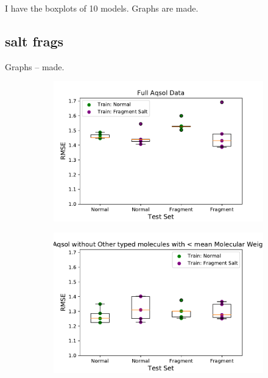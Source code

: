 \documentclass[journal=jmcmar,manuscript=article]{achemso}
\begin{document}
I have the boxplots of 10 models. Graphs are made.

\subsection{salt frags}
Graphs -- made.

\begin{figure}[tb]
    \centering
    \begin{subfigure}[t]{0.48\textwidth}
        \centering
        \includegraphics[width=\linewidth]{figures/full_saltfragfirst_RMSEs_boxplots.pdf}
    \end{subfigure}%
    \hfill
    \begin{subfigure}[t]{0.48\textwidth}
        \centering
        \includegraphics[width=\linewidth]{figures/othersMW_saltfragfirst_RMSEs_boxplots.pdf}
    \end{subfigure}
    

\end{figure}
\end{document}
